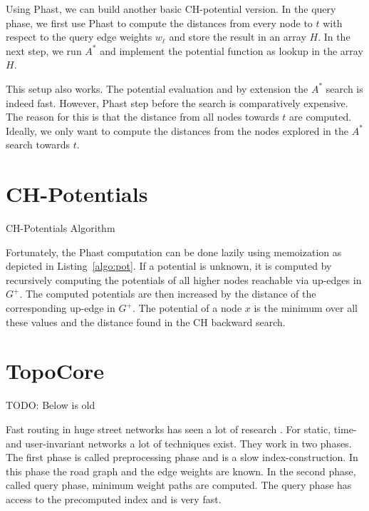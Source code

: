 \documentclass[a4paper,UKenglish,cleveref, autoref]{lipics-v2019}
\begin{document}
Using Phast, we can build another basic CH-potential version.
In the query phase, we first use Phast to compute the distances from every node to $t$ with respect to the query edge weights $w_\ell$ and store the result in an array $H$.
In the next step, we run $A^*$ and implement the potential function as lookup in the array $H$.

This setup also works.
The potential evaluation and by extension the $A^*$ search is indeed fast.
However, Phast step before the search is comparatively expensive.
The reason for this is that the distance from all nodes towards $t$ are computed.
Ideally, we only want to compute the distances from the nodes explored in the $A^*$ search towards $t$.

\section{CH-Potentials}

\begin{algorithm2e}
\caption{CH-Potentials Algorithm}
\label{algo:pot}
\end{algorithm2e}

Fortunately, the Phast computation can be done lazily using memoization as depicted in Listing~\ref{algo:pot}.
If a potential is unknown, it is computed by recursively computing the potentials of all higher nodes reachable via up-edges in $G^+$.
The computed potentials are then increased by the distance of the corresponding up-edge in $G^+$.
The potential of a node $x$ is the minimum over all these values and the distance found in the CH backward search.

\section{TopoCore}





TODO: Below is old

Fast routing in huge street networks has seen a lot of research \cite{bdgmpsww-rptn-16}.
For static, time- and user-invariant networks a lot of techniques exist.
They work in two phases.
The first phase is called preprocessing phase and is a slow index-construction.
In this phase the road graph and the edge weights are known.
In the second phase, called query phase, minimum weight paths are computed.
The query phase has access to the precomputed index and is very fast.
\end{document}
